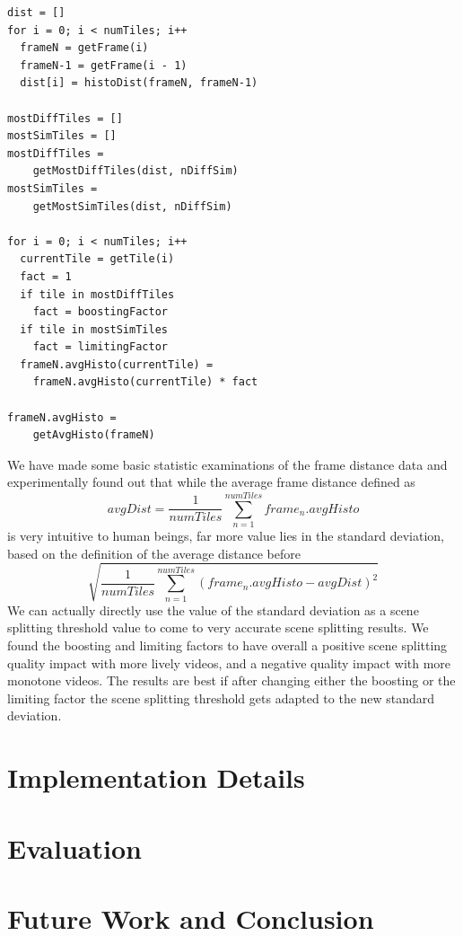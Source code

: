 \documentclass[10pt,twocolumn,letterpaper]{article}
\begin{document}
\begin{lstlisting}[caption=Pseudocode for our scene detection algorithm., label=code:algorithm, float=t, frame=single]
dist = []
for i = 0; i < numTiles; i++
  frameN = getFrame(i)
  frameN-1 = getFrame(i - 1)
  dist[i] = histoDist(frameN, frameN-1)
  
mostDiffTiles = []
mostSimTiles = []
mostDiffTiles =
    getMostDiffTiles(dist, nDiffSim)
mostSimTiles =
    getMostSimTiles(dist, nDiffSim)

for i = 0; i < numTiles; i++
  currentTile = getTile(i)
  fact = 1
  if tile in mostDiffTiles
    fact = boostingFactor
  if tile in mostSimTiles
    fact = limitingFactor
  frameN.avgHisto(currentTile) =
    frameN.avgHisto(currentTile) * fact
    
frameN.avgHisto =
    getAvgHisto(frameN)    
\end{lstlisting}

We have made some basic statistic examinations of the frame distance data and experimentally found out that while the average frame distance defined as $$avgDist = \frac{1}{numTiles}\sum_{n=1}^{numTiles}frame_{n}.avgHisto$$ is very intuitive to human beings, far more value lies in the standard deviation, based on the definition of the average distance before $$\sqrt{\frac{1}{numTiles}\sum_{n=1}^{numTiles}(frame_{n}.avgHisto - avgDist)^{2}}$$ We can actually directly use the value of the standard deviation as a scene splitting threshold value to come to very accurate scene splitting results. We found the boosting and limiting factors to have overall a positive scene splitting quality impact with more lively videos, and a negative quality impact with more monotone videos. The results are best if after changing either the boosting or the limiting factor the scene splitting threshold gets adapted to the new standard deviation.

\section{Implementation Details} \label{sec:implementation}

\section{Evaluation} \label{sec:evaluation}

\section{Future Work and Conclusion} \label{sec:future-work-conclusion}

{\small


}
\end{document}
